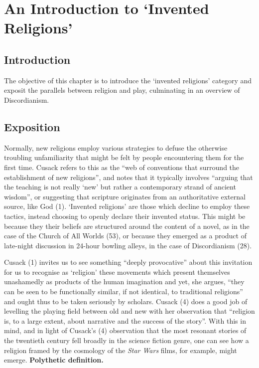 \documentclass[Draft.tex]{subfiles}
\begin{document}
\chapter{An Introduction to `Invented Religions'}

\section*{Introduction}
The objective of this chapter is to introduce
the `invented religions' category
and exposit the parallels between religion and play,
culminating in an overview of Discordianism.

\section*{Exposition}
Normally, new religions employ various strategies
to defuse the otherwise troubling unfamiliarity
that might be felt by people encountering them for the first time.
Cusack refers to this as the
``web of conventions that surround the establishment of new religions'',
and notes that it typically involves
``arguing that the teaching is not really `new' but rather
a contemporary strand of ancient wisdom'',
or suggesting that scripture originates from
an authoritative external source, like God (1).
`Invented religions' are those which decline to employ these tactics,
instead choosing to openly declare their invented status.
This might be because they their beliefs are structured around
the content of a novel,
as in the case of the Church of All Worlds (53),
or because they emerged as a product of late-night discussion in
24-hour bowling alleys, in the case of Discordianism (28).

Cusack (1) invites us to see something ``deeply provocative''
about this invitation for us to recognise as `religion'
these movements which present themselves unashamedly as
products of the human imagination and yet, she argues,
``they can be seen to be functionally similar, if not identical,
to traditional religions''
and ought thus to be taken seriously by scholars.
Cusack (4) does a good job of levelling the playing field
between old and new with her observation that
``religion is, to a large extent, about narrative
and the success of the story''.
With this in mind, and in light of Cusack's (4) observation
that the most resonant stories of the twentieth century
fell broadly in the science fiction genre,
one can see how a religion framed by the cosmology of
the \textit{Star Wars} films, for example, might emerge.
\textbf{Polythetic definition.}
\end{document}
